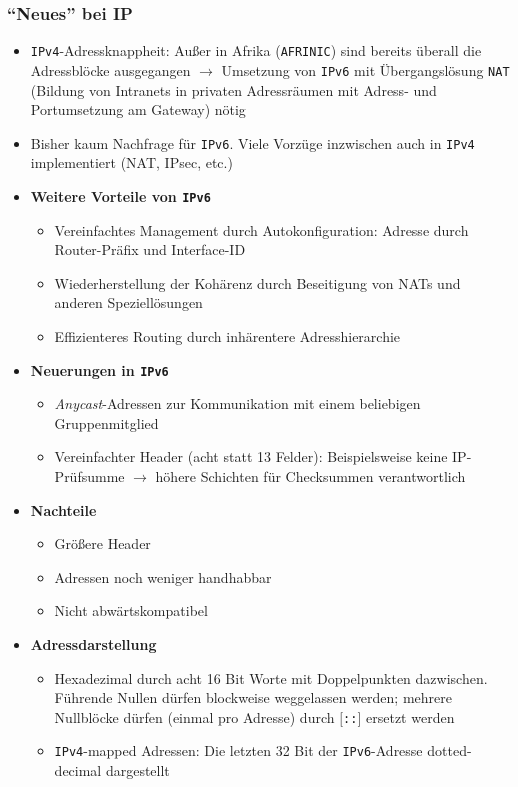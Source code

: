 \subsubsection{"`Neues"' bei IP}
\begin{itemize}
	\item \texttt{IPv4}-Adressknappheit: Außer in Afrika (\texttt{AFRINIC}) sind bereits überall die Adressblöcke ausgegangen \(\rightarrow\) Umsetzung von \texttt{IPv6} mit Übergangslösung \texttt{NAT} (Bildung von Intranets in privaten Adressräumen mit Adress- und Portumsetzung am Gateway) nötig
	\item Bisher kaum Nachfrage für \texttt{IPv6}. Viele Vorzüge inzwischen auch in \texttt{IPv4} implementiert (NAT, IPsec, etc.)
	\item \textbf{Weitere Vorteile von \texttt{IPv6}}
	\begin{itemize}
		\item Vereinfachtes Management durch Autokonfiguration: Adresse durch Router-Präfix und Interface-ID
		\item Wiederherstellung der Kohärenz durch Beseitigung von NATs und anderen Speziellösungen
		\item Effizienteres Routing durch inhärentere Adresshierarchie
	\end{itemize}
	\item \textbf{Neuerungen in \texttt{IPv6}}
	\begin{itemize}
		\item \textit{Anycast}-Adressen zur Kommunikation mit einem beliebigen Gruppenmitglied
		\item Vereinfachter Header (acht statt 13 Felder): Beispielsweise keine IP-Prüfsumme \(\rightarrow\) höhere Schichten für Checksummen verantwortlich
	\end{itemize}
	\item \textbf{Nachteile}
	\begin{itemize}
		\item Größere Header
		\item Adressen noch weniger handhabbar
		\item Nicht abwärtskompatibel
	\end{itemize}
	\item \textbf{Adressdarstellung}
	\begin{itemize}
		\item Hexadezimal durch acht 16 Bit Worte mit Doppelpunkten dazwischen. Führende Nullen dürfen blockweise weggelassen werden; mehrere Nullblöcke dürfen (einmal pro Adresse) durch \(\big\lbrack\)\texttt{::}\(\big\rbrack\) ersetzt werden
		\item \texttt{IPv4}-mapped Adressen: Die letzten 32 Bit der \texttt{IPv6}-Adresse dotted-decimal dargestellt
	\end{itemize}
\end{itemize}



